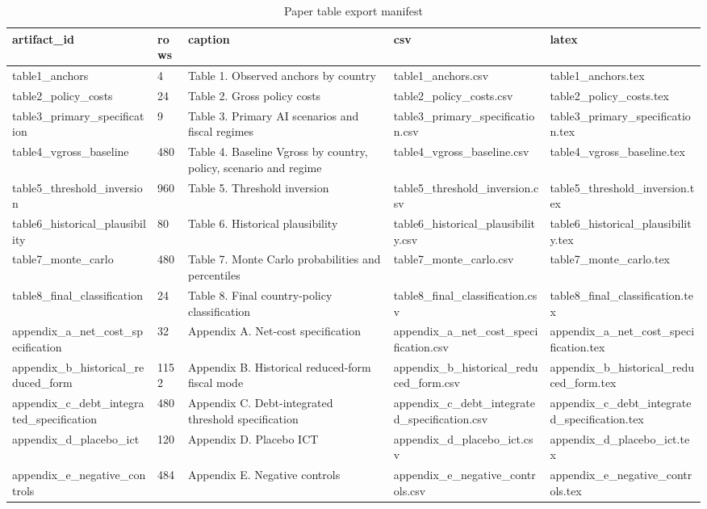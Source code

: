 \begin{table}[!htbp]
\centering
\caption{Paper table export manifest}
\begin{tabular}{lllll}
\toprule
artifact\_id & rows & caption & csv & latex \\
\midrule
table1\_anchors & 4 & Table 1. Observed anchors by country & table1\_anchors.csv & table1\_anchors.tex \\
table2\_policy\_costs & 24 & Table 2. Gross policy costs & table2\_policy\_costs.csv & table2\_policy\_costs.tex \\
table3\_primary\_specification & 9 & Table 3. Primary AI scenarios and fiscal regimes & table3\_primary\_specification.csv & table3\_primary\_specification.tex \\
table4\_vgross\_baseline & 480 & Table 4. Baseline Vgross by country, policy, scenario and regime & table4\_vgross\_baseline.csv & table4\_vgross\_baseline.tex \\
table5\_threshold\_inversion & 960 & Table 5. Threshold inversion & table5\_threshold\_inversion.csv & table5\_threshold\_inversion.tex \\
table6\_historical\_plausibility & 80 & Table 6. Historical plausibility & table6\_historical\_plausibility.csv & table6\_historical\_plausibility.tex \\
table7\_monte\_carlo & 480 & Table 7. Monte Carlo probabilities and percentiles & table7\_monte\_carlo.csv & table7\_monte\_carlo.tex \\
table8\_final\_classification & 24 & Table 8. Final country-policy classification & table8\_final\_classification.csv & table8\_final\_classification.tex \\
appendix\_a\_net\_cost\_specification & 32 & Appendix A. Net-cost specification & appendix\_a\_net\_cost\_specification.csv & appendix\_a\_net\_cost\_specification.tex \\
appendix\_b\_historical\_reduced\_form & 1152 & Appendix B. Historical reduced-form fiscal mode & appendix\_b\_historical\_reduced\_form.csv & appendix\_b\_historical\_reduced\_form.tex \\
appendix\_c\_debt\_integrated\_specification & 480 & Appendix C. Debt-integrated threshold specification & appendix\_c\_debt\_integrated\_specification.csv & appendix\_c\_debt\_integrated\_specification.tex \\
appendix\_d\_placebo\_ict & 120 & Appendix D. Placebo ICT & appendix\_d\_placebo\_ict.csv & appendix\_d\_placebo\_ict.tex \\
appendix\_e\_negative\_controls & 484 & Appendix E. Negative controls & appendix\_e\_negative\_controls.csv & appendix\_e\_negative\_controls.tex \\

\end{tabular}
\end{table}
